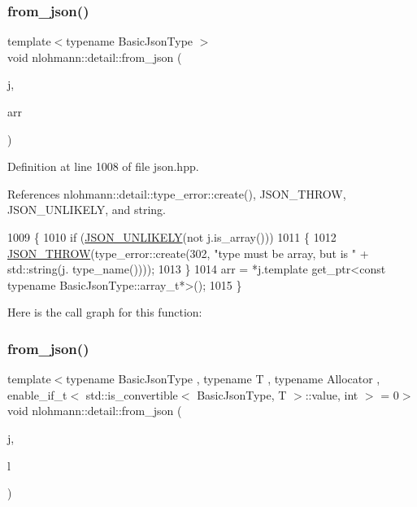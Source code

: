 \subsubsection{\texorpdfstring{from\+\_\+json()}{from\_json()}\hspace{0.1cm}{\footnotesize\ttfamily [7/14]}}
{\footnotesize\ttfamily template$<$typename Basic\+Json\+Type $>$ \\
void nlohmann\+::detail\+::from\+\_\+json (\begin{DoxyParamCaption}\item[{const Basic\+Json\+Type \&}]{j,  }\item[{typename Basic\+Json\+Type\+::array\+\_\+t \&}]{arr }\end{DoxyParamCaption})}



Definition at line 1008 of file json.\+hpp.



References nlohmann\+::detail\+::type\+\_\+error\+::create(), J\+S\+O\+N\+\_\+\+T\+H\+R\+OW, J\+S\+O\+N\+\_\+\+U\+N\+L\+I\+K\+E\+LY, and string.


\begin{DoxyCode}
1009 \{
1010     \textcolor{keywordflow}{if} (\hyperlink{json_8hpp_ab77582407c64944e7db1ea95ab520253}{JSON\_UNLIKELY}(not j.is\_array()))
1011     \{
1012         \hyperlink{json_8hpp_a6c274f6db2e65c1b66c7d41b06ad690f}{JSON\_THROW}(type\_error::create(302, \textcolor{stringliteral}{"type must be array, but is "} + std::string(j.
      type\_name())));
1013     \}
1014     arr = *j.template get\_ptr<const typename BasicJsonType::array\_t*>();
1015 \}
\end{DoxyCode}
Here is the call graph for this function\+:
\mbox{\label{namespacenlohmann_1_1detail_a5cfb765aad92795abd7fda29d017272a}} 
\subsubsection{\texorpdfstring{from\+\_\+json()}{from\_json()}\hspace{0.1cm}{\footnotesize\ttfamily [8/14]}}
{\footnotesize\ttfamily template$<$typename Basic\+Json\+Type , typename T , typename Allocator , enable\+\_\+if\+\_\+t$<$ std\+::is\+\_\+convertible$<$ Basic\+Json\+Type, T $>$\+::value, int $>$  = 0$>$ \\
void nlohmann\+::detail\+::from\+\_\+json (\begin{DoxyParamCaption}\item[{const Basic\+Json\+Type \&}]{j,  }\item[{std\+::forward\+\_\+list$<$ T, Allocator $>$ \&}]{l }\end{DoxyParamCaption})}



